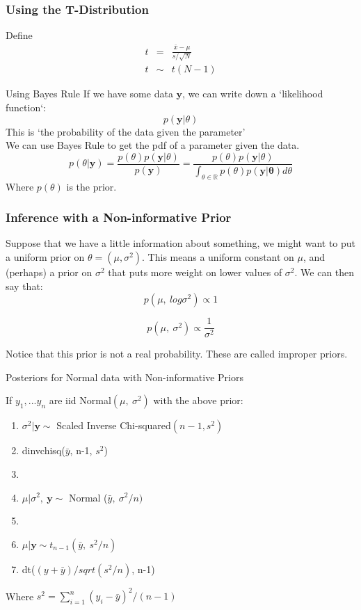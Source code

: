 \documentclass{beamer}
\numberwithin{equation}{section}
\begin{document}
\begin{frame}
\frametitle{Using the T-Distribution}

Define 
\begin{eqnarray}
t & = & \frac{\bar{x} - \mu}{s/\sqrt{N}} \nonumber \\
t & \sim & t(N-1) \nonumber 
\end{eqnarray}


\end{frame}





\begin{frame}{Using Bayes Rule}
If we have some data $\mathbf{y}$, we can write down a `likelihood function`:
$$p(\mathbf{y}|\theta)$$
This is `the probability of the data given the parameter'\\
We can use Bayes Rule to get the pdf of a parameter given the data.
$$p(\theta|\mathbf{y})=\frac{p(\theta)p(\mathbf{y}|\theta)}{p(\mathbf{y})}=\frac{p(\theta)p(\mathbf{y}|\theta)}{\int_{\theta\in \mathbb{R}} p(\theta)p(\mathbf{y|\theta})d\theta}$$
Where $p(\theta)$ is the prior.
\end{frame}






\begin{frame}
\frametitle{Inference with a Non-informative Prior}

Suppose that we have a little information about something, we might want to put a uniform prior on $\theta=(\mu, \sigma^2)$.  This means a uniform constant on $\mu$, and (perhaps) a prior on $\sigma^2$ that puts more weight on lower values of $\sigma^2$.  We can then say that:
$$p(\mu,\ log \sigma^2)\propto 1$$

$$p(\mu,\ \sigma^2)\propto \frac{1}{\sigma^2}$$

Notice that this prior is not a real probability.  These are called improper priors.
\end{frame}


\begin{frame}{Posteriors for Normal data with Non-informative Priors}

If $y_1,... y_n$ are iid Normal$(\mu,\ \sigma^2)$ with the above prior:

\begin{enumerate}
\item[a)] $\sigma^2|\mathbf{y}\sim$ Scaled Inverse Chi-squared$(n-1, s^2)$
\item[] dinvchisq($\bar{y}$, n-1, $s^2$)
\item[]
\item[b)] $\mu|\sigma^2,\ \mathbf{y} \sim$ Normal ($\bar{y},\ \sigma^2/n)$
\item[]
\item[c)] $\mu|\mathbf{y}\sim t_{n-1}(\bar{y},\ s^2/n)$
\item[] dt($(y+\bar{y})/sqrt(s^2/n)$,  n-1)
\end{enumerate}
Where $s^2=\sum_{i=1}^n(y_i - \bar{y})^2/(n-1)$
\end{frame}
\end{document}
